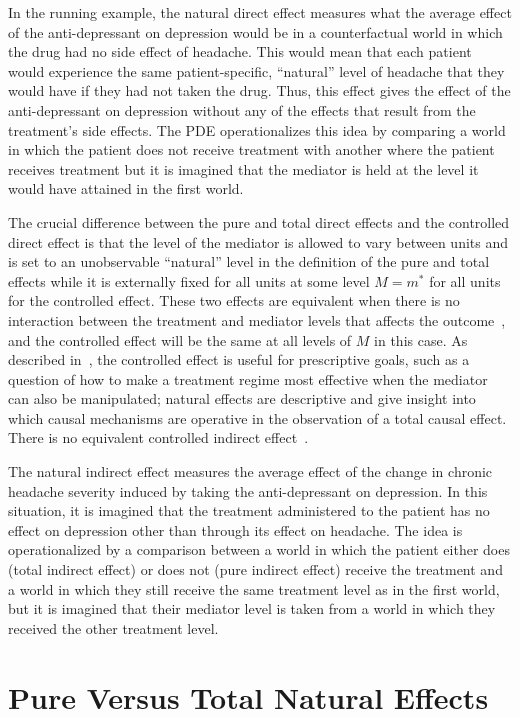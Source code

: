 In the running example, the natural direct effect measures what the average effect of 
the anti-depressant on depression would be in a counterfactual world in which the drug had no side effect of headache. 
This would mean that each patient would experience the same patient-specific, ``natural'' level of headache 
that they would have if they had not taken the drug. Thus, this effect
gives the effect of the anti-depressant on depression without any of the effects that result from the treatment's 
side effects. The PDE operationalizes this idea by comparing a world in which the patient does not receive treatment with 
another where the patient receives treatment but it is imagined that the mediator is held at the level it would have
attained in the first world. 

The crucial difference between the pure and total direct effects and the controlled direct effect is that the level of the 
mediator is allowed to vary between units and is set to an unobservable ``natural'' level in the definition of the pure and
total effects while it is externally fixed 
for all units at some level $M = m^{*}$ for all units for the controlled effect. These two effects are equivalent when there 
is no interaction between the treatment and mediator levels that affects the outcome~\citep{pearl2001}, and the controlled 
effect will be the same at all levels of $M$ in this case. As described in~\citep{pearl2001}, the 
controlled effect is useful for prescriptive goals, such as a question of how to make a treatment regime most effective 
when the mediator can also be manipulated; natural effects are descriptive and give insight into which causal mechanisms 
are operative in the observation of a total causal effect. There is no equivalent controlled 
indirect effect~\citep{pearl2001}. 

The natural indirect effect measures the average effect of the change in chronic headache severity 
induced by taking the anti-depressant on depression. In this situation, it is imagined that the treatment administered
to the patient has no effect on depression other than through its effect on headache. The idea is operationalized by
a comparison between a world in which the patient either does (total indirect effect) or does not (pure indirect effect)
receive the treatment and a world in which they still receive the same treatment level as in the first world, 
but it is imagined that their mediator level is taken from a world in which they received the other treatment level. 


\section{Pure Versus Total Natural Effects}\label{subsection:pure_total_natural_effects}

